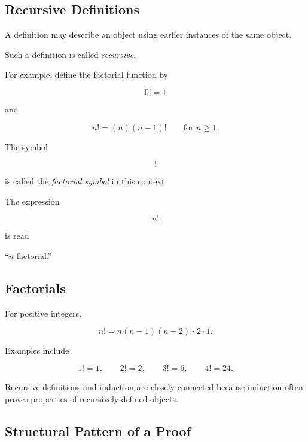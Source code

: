 \subsection{Recursive Definitions}
\label{subsec:recursive-definitions}

A definition may describe an object using earlier instances of the same
object.

Such a definition is called \emph{recursive}.

For example, define the factorial function by

\[ 0!=1 \]

and

\[ n!=(n)(n-1)! \qquad\text{for }n\geq1. \]

The symbol

\[ ! \]

is called the \emph{factorial symbol} in this context.

The expression

\[ n! \]

is read

\begin{center}
``\(n\) factorial.''
\end{center}

\subsection{Factorials}
\label{subsec:factorials-proof}

For positive integers,

\[ n!=n(n-1)(n-2)\cdots2\cdot1. \]

Examples include

\[ 1!=1,\qquad 2!=2,\qquad 3!=6,\qquad 4!=24. \]

Recursive definitions and induction are closely connected because induction
often proves properties of recursively defined objects.

\subsection{Structural Pattern of a Proof}
\label{subsec:structural-pattern-proof}

